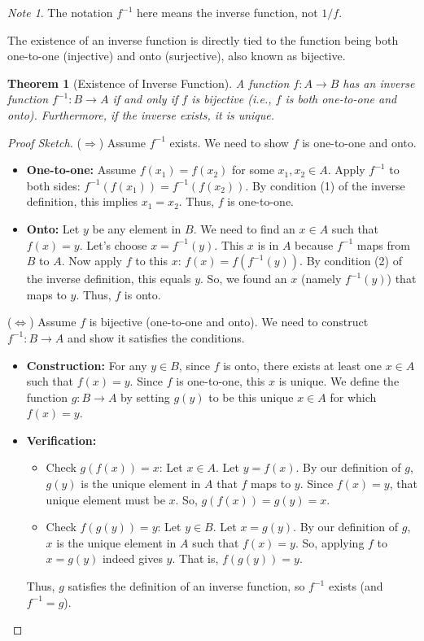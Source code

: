 \documentclass[11pt]{article}
\newtheorem{theorem}{Theorem}[section]
\theoremstyle{definition}
\theoremstyle{remark}
\newtheorem*{note}{Note}
\begin{document}
\begin{note}
The notation $f^{-1}$ here means the inverse function, not $1/f$.
\end{note}

The existence of an inverse function is directly tied to the function being both one-to-one (injective) and onto (surjective), also known as bijective.

\begin{theorem}[Existence of Inverse Function] \label{thm:inverse_iff_bijective}
A function $f: A \to B$ has an inverse function $f^{-1}: B \to A$ if and only if $f$ is bijective (i.e., $f$ is both one-to-one and onto). Furthermore, if the inverse exists, it is unique.
\end{theorem}

\begin{proof}[Proof Sketch]

($\Rightarrow$) Assume $f^{-1}$ exists. We need to show $f$ is one-to-one and onto.
\begin{itemize}
    \item \textbf{One-to-one:} Assume $f(x_1) = f(x_2)$ for some $x_1, x_2 \in A$. Apply $f^{-1}$ to both sides: $f^{-1}(f(x_1)) = f^{-1}(f(x_2))$. By condition (1) of the inverse definition, this implies $x_1 = x_2$. Thus, $f$ is one-to-one.
    \item \textbf{Onto:} Let $y$ be any element in $B$. We need to find an $x \in A$ such that $f(x)=y$. Let's choose $x = f^{-1}(y)$. This $x$ is in $A$ because $f^{-1}$ maps from $B$ to $A$. Now apply $f$ to this $x$: $f(x) = f(f^{-1}(y))$. By condition (2) of the inverse definition, this equals $y$. So, we found an $x$ (namely $f^{-1}(y)$) that maps to $y$. Thus, $f$ is onto.
\end{itemize}

($\Leftrightarrow$) Assume $f$ is bijective (one-to-one and onto). We need to construct $f^{-1}: B \to A$ and show it satisfies the conditions. %
\begin{itemize}
    \item \textbf{Construction:} For any $y \in B$, since $f$ is onto, there exists at least one $x \in A$ such that $f(x)=y$. Since $f$ is one-to-one, this $x$ is unique. We define the function $g: B \to A$ by setting $g(y)$ to be this unique $x \in A$ for which $f(x)=y$.
    \item \textbf{Verification:}
        \begin{itemize}
            \item Check $g(f(x)) = x$: Let $x \in A$. Let $y = f(x)$. By our definition of $g$, $g(y)$ is the unique element in $A$ that $f$ maps to $y$. Since $f(x)=y$, that unique element must be $x$. So, $g(f(x)) = g(y) = x$.
            \item Check $f(g(y)) = y$: Let $y \in B$. Let $x = g(y)$. By our definition of $g$, $x$ is the unique element in $A$ such that $f(x)=y$. So, applying $f$ to $x=g(y)$ indeed gives $y$. That is, $f(g(y)) = y$.
        \end{itemize}
    Thus, $g$ satisfies the definition of an inverse function, so $f^{-1}$ exists (and $f^{-1}=g$).
\end{itemize}


\end{proof}
\end{document}
